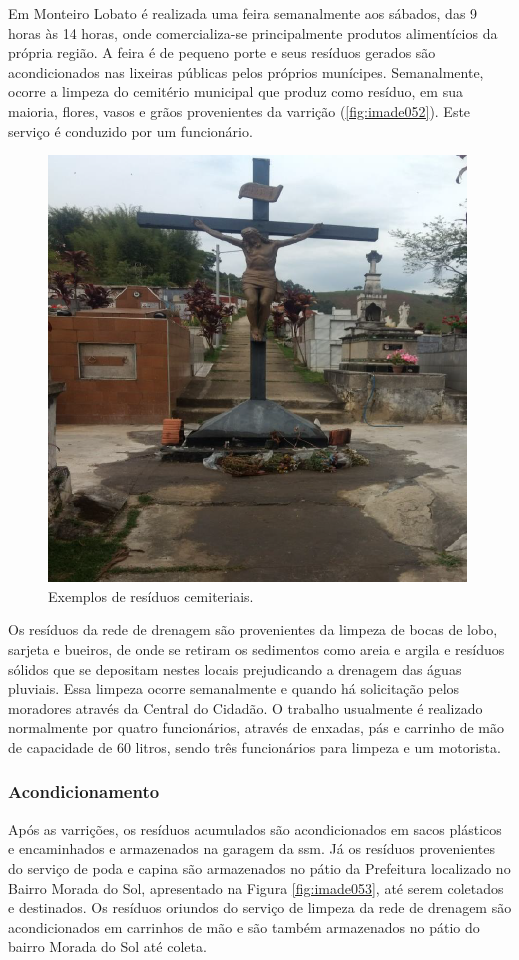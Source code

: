 Em Monteiro Lobato é realizada uma feira semanalmente aos sábados, das 9 horas às 14 horas, onde comercializa-se principalmente produtos alimentícios da própria região. A feira é de pequeno porte e seus resíduos gerados são acondicionados nas lixeiras públicas pelos próprios munícipes. Semanalmente, ocorre a limpeza do cemitério municipal que produz como resíduo, em sua maioria, flores, vasos e grãos provenientes da varrição (\autoref{fig:imade052}). Este serviço é conduzido por um funcionário.

\begin{figure}
	\centering
	\includegraphics[width=0.5\linewidth]{produtos/prodtres/image052}
	\caption{Exemplos de resíduos cemiteriais.}
	\label{fig:image052}
\end{figure}


Os resíduos da rede de drenagem são provenientes da limpeza de bocas de lobo, sarjeta e bueiros, de onde se retiram os sedimentos como areia e argila e resíduos sólidos que se depositam nestes locais prejudicando a drenagem das águas pluviais. Essa limpeza ocorre semanalmente e quando há solicitação pelos moradores através da Central do Cidadão. O trabalho usualmente é realizado normalmente por quatro funcionários, através de enxadas, pás e carrinho de mão de capacidade de 60 litros, sendo três funcionários para limpeza e um motorista.

\subsubsection{Acondicionamento}

Após as varrições, os resíduos acumulados são acondicionados em sacos plásticos e encaminhados e armazenados na garagem da \gls{ssm}.  Já os resíduos provenientes do serviço de poda e capina são armazenados no pátio da Prefeitura localizado no Bairro Morada do Sol, apresentado na Figura \ref{fig:imade053}, até serem coletados e destinados. Os resíduos oriundos do serviço de limpeza da rede de drenagem são acondicionados em carrinhos de mão e são também armazenados no pátio do bairro Morada do Sol até coleta.


